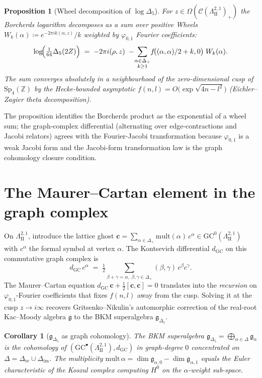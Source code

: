 \documentclass[11pt]{article}
\newtheorem{proposition}[theorem]{Proposition}
\newtheorem{corollary}[theorem]{Corollary}
\newcommand{\LII}{\Lambda^{2,1}_{\mathrm{II}}}
\newcommand{\phii}{\varphi_{0,1}}
\newcommand{\Dlt}{\Delta_5}
\begin{document}
\begin{proposition}[Wheel decomposition of $\log\Dlt$]\label{prop:wheel}
For $z\in \Omega(\mathcal{C}(\LII)_+)$ the Borcherds logarithm
decomposes as a sum over \emph{positive Wheels}
$W_k(\alpha) \coloneqq e^{-2\pi i k(\alpha,z)}/k$
weighted by $\phii$ Fourier coefficients:
\[
\log\!\Bigl(\tfrac{1}{64}\Dlt(2Z)\Bigr)
\;=\; -2\pi i(\rho,z)
\;-\!\sum_{\substack{\alpha\in\Delta_+\\ k\geq 1}}\!
f\!\bigl((\alpha,\alpha)/2+k,0\bigr)\;W_k(\alpha).
\]
The sum converges absolutely in a neighbourhood of the
zero-dimensional cusp of $\mathrm{Sp}_4(\mathbb{Z})$ by the
Hecke-bounded asymptotic $f(n,l) = O\!\bigl(\exp\sqrt{4n-l^2}\bigr)$
(Eichler--Zagier theta decomposition).
\end{proposition}

The proposition identifies the Borcherds product as the exponential of
a wheel sum; the graph-complex differential (alternating over
edge-contractions and Jacobi relators) agrees with the Fourier-Jacobi
transformation because $\phii$ is a weak Jacobi form and the
Jacobi-form transformation law is the graph cohomology closure
condition.

\section{The Maurer--Cartan element in the graph complex}

On $\LII$, introduce the lattice ghost
$\mathbf{c} = \sum_{\alpha\in\Delta_+}\mathrm{mult}(\alpha)\,
c^\alpha\in \mathrm{GC}^0(\LII)$ with $c^\alpha$ the formal symbol at
vertex $\alpha$. The Kontsevich differential $d_{\mathrm{GC}}$ on this
commutative graph complex is
\[
d_{\mathrm{GC}}\,c^\alpha
\;=\; \tfrac{1}{2}\!\sum_{\beta+\gamma=\alpha,\;
\beta,\gamma\in\Delta_+}\!
\!(\beta,\gamma)\,c^\beta c^\gamma.
\]
The Maurer--Cartan equation
$d_{\mathrm{GC}}\,\mathbf{c} + \tfrac{1}{2}[\mathbf{c},\mathbf{c}]=0$
translates into the \emph{recursion} on $\phii$-Fourier coefficients
that fixes $f(n,l)$ away from the cusp. Solving it at the cusp
$z\to i\infty$ recovers Gritsenko--Nikulin's automorphic correction
of the real-root Kac--Moody algebra $\mathfrak{g}$ to the BKM
superalgebra $\mathfrak{g}_{\Dlt}$.

\begin{corollary}[$\mathfrak{g}_{\Dlt}$ as graph cohomology]\label{cor:gc}
The BKM superalgebra
$\mathfrak{g}_{\Dlt}=\bigoplus_{\alpha\in\Delta}\mathfrak{g}_\alpha$
is the cohomology of
$(\mathrm{GC}^\bullet(\LII),d_{\mathrm{GC}})$ in graph-degree $0$
concentrated on $\Delta = \Delta_{\mathrm{re}}\cup\Delta_{\mathrm{im}}$.
The multiplicity $\mathrm{mult}\,\alpha = \dim\mathfrak{g}_{\alpha,0} -
\dim\mathfrak{g}_{\alpha,1}$ equals the Euler characteristic of the
Koszul complex computing $H^0$ on the $\alpha$-weight sub-space.
\end{corollary}
\end{document}
